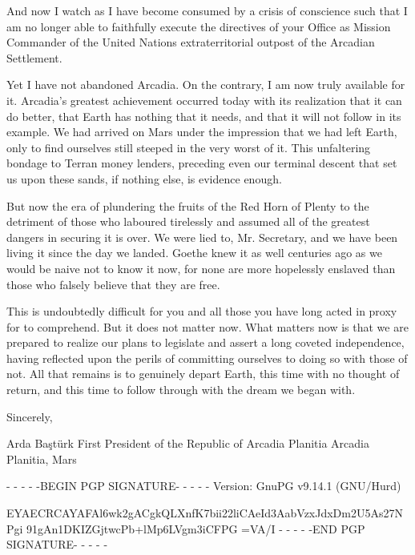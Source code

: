 And now I watch as I have become consumed by a crisis of conscience such that I am no longer able to faithfully execute the directives of your Office as Mission Commander of the United Nations extraterritorial outpost of the Arcadian Settlement.

Yet I have not abandoned Arcadia. On the contrary, I am now truly available for it. Arcadia's greatest achievement occurred today with its realization that it can do better, that Earth has nothing that it needs, and that it will not follow in its example. We had arrived on Mars under the impression that we had left Earth, only to find ourselves still steeped in the very worst of it. This unfaltering bondage to Terran money lenders, preceding even our terminal descent that set us upon these sands, if nothing else, is evidence enough.

But now the era of plundering the fruits of the Red Horn of Plenty to the detriment of those who laboured tirelessly and assumed all of the greatest dangers in securing it is over. We were lied to, Mr. Secretary, and we have been living it since the day we landed. Goethe knew it as well centuries ago as we would be naive not to know it now, for none are more hopelessly enslaved than those who falsely believe that they are free.

This is undoubtedly difficult for you and all those you have long acted in proxy for to comprehend. But it does not matter now. What matters now is that we are prepared to realize our plans to legislate and assert a long coveted independence, having reflected upon the perils of committing ourselves to doing so with those of not. All that remains is to genuinely depart Earth, this time with no thought of return, and this time to follow through with the dream we began with.

Sincerely, 

\hskip 1.5cm 
   
Arda Baştürk
First President of the Republic of Arcadia Planitia
Arcadia Planitia, Mars

- - - - -BEGIN PGP SIGNATURE- - - - -
Version: GnuPG v9.14.1 (GNU/Hurd)

EYAECRCAYAFAl6wk2gACgkQLXnfK7bii22liCAeId3AabVzxJdxDm2U5As27NPgi
91gAn1DKIZGjtwcPb+lMp6LVgm3iCFPG
=VA/I
- - - - -END PGP SIGNATURE- - - - -


